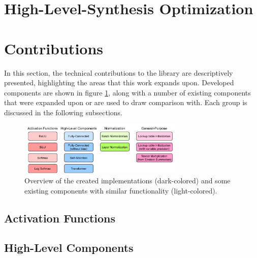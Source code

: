 \section{High-Level-Synthesis Optimization}
\indo{|}
\indo{|}
\indo{|}
\indo{|}
\indo{|}
\indo{|}
\indo{|}
\indo{|}
\indo{|}
\indo{|}
\indo{|}
\indo{|}


\section{\hlsml Contributions}
In this section, the technical contributions to the \hlsml library are descriptively presented, highlighting the areas that this work expands upon. Developed components are shown in figure \ref{fig:hls4ml-contributions}, along with a number of existing components that were expanded upon or are used to draw comparison with. Each group is discussed in the following subsections.

\begin{figure}[hpt!]
  \centering
  \includegraphics[trim={0cm 0cm 0cm 0cm}, clip, width=0.7\textwidth, center]{evaluation/hls4ml_blocks.pdf}
  \caption{Overview of the created implementations (dark-colored) and some existing components with similar functionality (light-colored).}
  \label{fig:hls4ml-contributions}
\end{figure}


\subsection{Activation Functions}
\indo{|}
\indo{|}

\subsection{High-Level Components}
\indo{|}
\indo{|}
\indo{|}
\indo{|}


